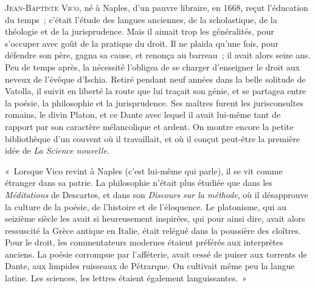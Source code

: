 \documentclass[french,twoside]{book} %
\newenvironment{quoteblock}%
  {\begin{quoting}}
  {\end{quoting}}
\newenvironment{quotebar}{%
    \def\FrameCommand{{\color{rubric!10!}\vrule width 0.5em} \hspace{0.9em}}%
    \def\OuterFrameSep{\itemsep} %
    \MakeFramed {\advance\hsize-\width \FrameRestore}
  }%
  {%
    \endMakeFramed
  }
\renewenvironment{quoteblock}%
  {%
    \savenotes
    \setstretch{0.9}
    \normalfont
    \begin{quotebar}
  }
  {%
    \end{quotebar}
    \spewnotes
  }
\begin{document}
{\scshape Jean-Baptiste Vico}, né à Naples, d’un pauvre libraire, en 1668, reçut l’éducation du temps ; c’était l’étude des langues anciennes, de la scholastique,  de la théologie et de la jurisprudence. Mais il aimait trop les généralités, pour s’occuper avec goût de la pratique du droit. Il ne plaida qu’une fois, pour défendre son père, gagna sa cause, et renonça au barreau ; il avait alors seize ans. Peu de temps après, la nécessité l’obligea de se charger d’enseigner le droit aux neveux de l’évêque d’Ischia. Retiré pendant neuf années dans la belle solitude de Vatolla, il suivit en liberté la route que lui traçait son génie, et se partagea entre la poésie, la philosophie et la jurisprudence. Ses maîtres furent les jurisconsultes romains, le divin Platon, et ce Dante avec lequel il avait lui-même tant de rapport par son caractère mélancolique et ardent. On montre encore la petite bibliothèque d’un couvent où il travaillait, et où il conçut peut-être la première idée de {\itshape La Science nouvelle}.\par

\begin{quoteblock}
 \noindent « Lorsque Vico revint à Naples (c’est lui-même qui parle), il se vit comme étranger dans sa patrie. La philosophie n’était plus étudiée que dans les {\itshape Méditations} de Descartes, et dans son {\itshape Discours sur la méthode}, où il désapprouve la culture de la poésie, de l’histoire et de l’éloquence. Le platonisme, qui au seizième siècle les avait si heureusement inspirées, qui pour ainsi dire, avait alors ressuscité la Grèce antique en Italie, était relégué dans la poussière des cloîtres. Pour le droit, les  commentateurs modernes étaient préférés aux interprètes anciens. La poésie corrompue par l’afféterie, avait cessé de puiser aux torrents de Dante, aux limpides ruisseaux de Pétrarque. On cultivait même peu la langue latine. Les sciences, les lettres étaient également languissantes. »
 \end{quoteblock}
\end{document}
